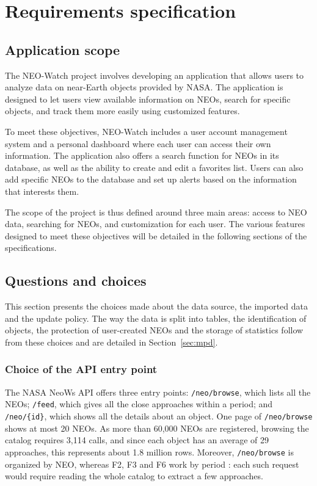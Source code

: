\section{Requirements specification}
\subsection{Application scope}


The NEO-Watch project involves developing an application that allows users to analyze data on near-Earth objects provided by NASA. The application is designed to let users view available information on NEOs, search for specific objects, and track them more easily using customized features.

\vspace{0.25cm}

To meet these objectives, NEO-Watch includes a user account management system and a personal dashboard where each user can access their own information. The application also offers a search function for NEOs in its database, as well as the ability to create and edit a favorites list. Users can also add specific NEOs to the database and set up alerts based on the information that interests them.

\vspace{0.25cm}

The scope of the project is thus defined around three main areas: access to NEO data, searching for NEOs, and customization for each user. The various features designed to meet these objectives will be detailed in the following sections of the specifications.

\subsection{Questions and choices}

This section presents the choices made about the data source, the imported
data and the update policy. The way the data is split into tables, the
identification of objects, the protection of user-created NEOs and the
storage of statistics follow from these choices and are detailed in
Section~\ref{sec:mpd}.

\subsubsection{Choice of the API entry point}

The NASA NeoWs API offers three entry points: \texttt{/neo/browse}, which
lists all the NEOs; \texttt{/feed}, which gives all the close approaches
within a period; and \texttt{/neo/\{id\}}, which shows all the details about
an object. One page of \texttt{/neo/browse} shows at most 20 NEOs. As more
than 60,000 NEOs are registered, browsing the catalog requires 3,114 calls,
and since each object has an average of 29 approaches, this represents about
1.8 million rows. Moreover, \texttt{/neo/browse} is organized by NEO, whereas
F2, F3 and F6 work by period  : each such request would require reading the
whole catalog to extract a few approaches.

